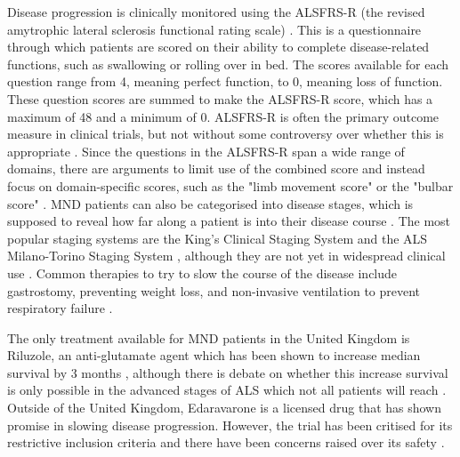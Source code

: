 Disease progression is clinically monitored using the ALSFRS-R (the revised amytrophic lateral sclerosis functional rating scale) \cite{cedarbaumALSFRSRRevisedALS1999}. This is a questionnaire through which patients are scored on their ability to complete disease-related functions, such as swallowing or rolling over in bed. The scores available for each question range from 4, meaning perfect function, to 0, meaning loss of function. These question scores are summed to make the ALSFRS-R score, which has a maximum of 48 and a minimum of 0. ALSFRS-R is often the primary outcome measure in clinical trials, but not without some controversy over whether this is appropriate \cite{vaneijkOldFriendWho2021}. Since the questions in the ALSFRS-R span a wide range of domains, there are arguments to limit use of the combined score and instead focus on domain-specific scores, such as the "limb movement score" or the "bulbar score" \cite{rooneyWhatDoesALSFRSR2017}.
MND patients can also be categorised into disease stages, which is supposed to reveal how far along a patient is into their disease course \cite{feldmanAmyotrophicLateralSclerosis2022}. The most popular staging systems are the King's Clinical Staging System \cite{rocheProposedStagingSystem2012} and the ALS Milano-Torino Staging System \cite{chioDevelopmentEvaluationClinical2015}, although they are not yet in widespread clinical use \cite{fangComparisonKingMiToS2017}. Common therapies to try to slow the course of the disease include gastrostomy, preventing weight loss, and non-invasive ventilation to prevent respiratory failure \cite{bourkeEffectsNoninvasiveVentilation2006}.

The only treatment available for MND patients in the United Kingdom is Riluzole, an anti-glutamate agent which has been shown to increase median survival by 3 months \cite{millerRiluzoleAmyotrophicLateral2012, hinchcliffeRiluzoleRealworldEvidence2017}, although there is debate on whether this increase survival is only possible in the advanced stages of ALS which not all patients will reach \cite{andrewsRealworldEvidenceRiluzole2020}.
Outside of the United Kingdom, Edaravarone is a licensed drug that has shown promise in slowing disease progression. However, the trial has been critised for its restrictive inclusion criteria and there have been concerns raised over its safety \cite{witzelSafetyEffectivenessLongterm2022}.

